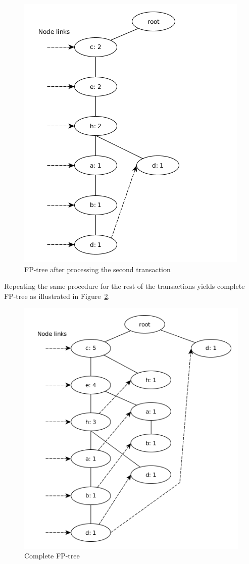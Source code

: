 \begin{figure} %
	\centering
	\includegraphics[scale=0.5]{fp-tree-example/fp-tree-p2.png}
	\caption{FP-tree after processing the second transaction}
	\label{figure:fp-growth-example2}
\end{figure}

Repeating the same procedure for the rest of the transactions yields complete FP-tree as illustrated in Figure~\ref{figure:fp-growth-example3}.

\begin{figure} %
	\centering
	\includegraphics[scale=0.5]{fp-tree-example/fp-tree-p3.png}
	\caption{Complete FP-tree}
	\label{figure:fp-growth-example3}
\end{figure}

